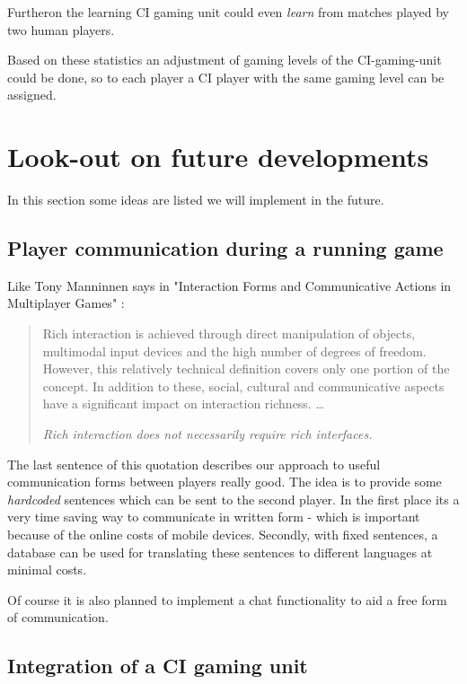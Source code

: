 		Furtheron the learning CI gaming unit could even \textit{learn} from
		matches played by two human players.
		
		Based on these statistics an adjustment of gaming levels of the
		CI-gaming-unit could be done, so to each player a CI player with the
		same gaming level can be assigned.


\section{Look-out on future developments}

	In this section some ideas are listed we will implement in the future.
	
	\subsection{Player communication during a running game}
	
		Like Tony Manninnen says in "Interaction Forms and Communicative Actions
		in Multiplayer Games" \cite{mann03}:
		
		\begin{quotation}
		
			Rich interaction is achieved through direct manipulation of objects,
			multimodal input devices and the high number of degrees of freedom.
			However, this relatively technical definition covers only one
			portion of the concept. In addition to these, social, cultural and
			communicative aspects have a significant impact on interaction
			richness. \ldots
		
			\textit{Rich interaction does not necessarily require rich
			interfaces.}
			
		\end{quotation}
		
		The last sentence of this quotation describes our approach to useful
		communication forms between players really good. The idea is to provide
		some \emph{hardcoded} sentences which can be sent to the second player.
		In the first place its a very time saving way to communicate in written
		form - which is important because of the online costs of mobile devices.
		Secondly, with fixed sentences, a database can be used for translating
		these sentences to different languages at minimal costs.
		
		Of course it is also planned to implement a chat functionality to aid a
		free form of communication.
	
	\subsection{Integration of a CI gaming unit}

